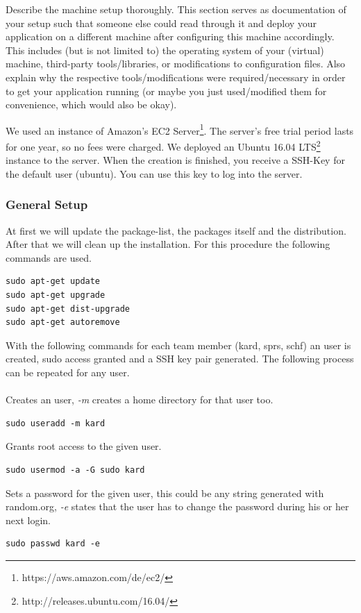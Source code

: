 Describe the machine setup thoroughly. This section serves as documentation of
your setup such that someone else could read through it and deploy your
application on a different machine after configuring this machine accordingly.
This includes (but is not limited to) the operating system of your (virtual)
machine, third-party tools/libraries, or modifications to configuration files.
Also explain why the respective tools/modifications were required/necessary in
order to get your application running (or maybe you just used/modified them for
convenience, which would also be okay).


We used an instance of Amazon's EC2 Server\footnote{https://aws.amazon.com/de/ec2/}. The server's free trial period lasts for one year, so no fees were charged. We deployed an Ubuntu 16.04 LTS\footnote{http://releases.ubuntu.com/16.04/} instance to the server. When the creation is finished, you receive a SSH-Key for the default user (ubuntu). You can use this key to log into the server.

\subsubsection{General Setup}
\label{sec:setup}
At first we will update the package-list, the packages itself and the distribution. After that we will clean up the installation. For this procedure the following commands are used.
\begin{lstlisting}
sudo apt-get update
sudo apt-get upgrade
sudo apt-get dist-upgrade
sudo apt-get autoremove
\end{lstlisting}

With the following commands for each team member (kard, sprs, schf) an user is created, sudo access granted and a SSH key pair generated. The following process can be repeated for any user. 
\\\\
Creates an user, \textit{-m} creates a home directory for that user too.
\begin{lstlisting}
sudo useradd -m kard
\end{lstlisting}

Grants root access to the given user.
\begin{lstlisting}
sudo usermod -a -G sudo kard
\end{lstlisting}

Sets a password for the given user, this could be any string generated with random.org, \textit{-e} states that the user has to change the password during his or her next login.
\begin{lstlisting}
sudo passwd kard -e
\end{lstlisting}

